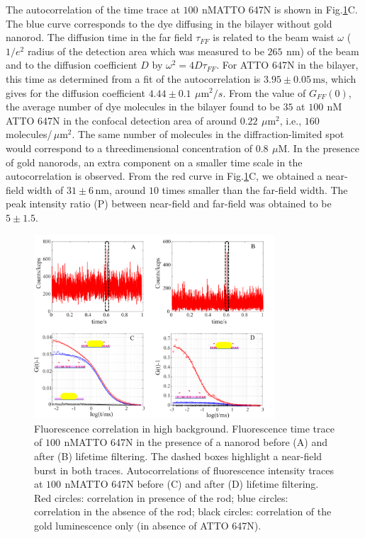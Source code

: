 \documentclass[journal=jpccck,manuscript=article]{achemso}
\newcommand{\nm}{\ensuremath{\,\textrm{nm}}}
\newcommand{\um}{\ensuremath{\,\mu\textrm{m}}}
\newcommand{\uM}{\ensuremath{\,\mu\textrm{M}}}
\newcommand{\nM}{\ensuremath{\,\textrm{nM}}}
\newcommand{\ms}{\ensuremath{\,\textrm{ms}}}
\begin{document}
The autocorrelation of the time trace at $100~$\nM ATTO 647N is shown in Fig.\ref{fig:corr_enhnc}C. The blue curve corresponds to the dye diffusing in the bilayer without gold nanorod. The diffusion time in the far field $\tau_{FF}$ is related to the beam waist $\omega$ ($1/e^2$ radius of the detection area which was measured to be $265~$\nm) of the beam and to the diffusion coefficient $D$ by $\omega^2=4D\tau_{FF}$. For ATTO 647N in the bilayer, this time as determined from a fit of the autocorrelation is $3.95\pm0.05$\ms, which gives for the diffusion coefficient $4.44\pm0.1~\um^2/s$. From the value of $G_{FF}(0)$, the average number of dye molecules in the bilayer found to be $35$ at $100~$\nM ATTO 647N in the confocal detection area of around $0.22~\um^2$, i.e., $160$ molecules/$\um^2$. The same number of molecules in the diffraction-limited spot would correspond to a threedimensional concentration of $0.8~$\uM. In the presence of gold nanorods, an extra component on a smaller time scale in the autocorrelation is observed. From the red curve in Fig.\ref{fig:corr_enhnc}C, we obtained a near-field width of $31\pm6\nm$, around $10$ times smaller than the far-field width. The peak intensity ratio (P) between near-field and far-field was obtained to be $5\pm1.5$.\\
\begin{figure}
	\centering
	\includegraphics[width=0.8\textwidth]{corr_enhnc.png}
	\caption{Fluorescence correlation in high background. Fluorescence time trace of $100~$\nM ATTO 647N in the presence of a nanorod before (A) and after (B) lifetime filtering. The dashed boxes highlight a near-field burst in both traces. Autocorrelations of fluorescence intensity traces at $100~$\nM ATTO 647N before (C) and after (D) lifetime filtering. Red circles: correlation in presence of the rod; blue circles: correlation in the absence of the rod; black circles: correlation of the gold luminescence only (in absence of ATTO 647N).}
	\label{fig:corr_enhnc}
\end{figure}
\end{document}
